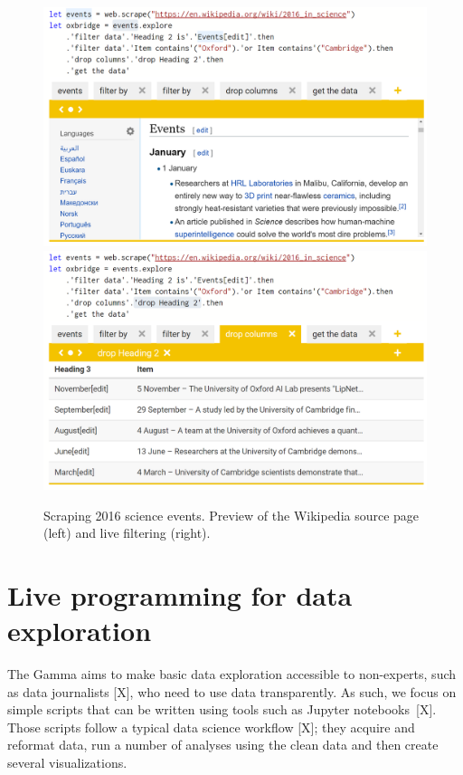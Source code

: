 \documentclass[sigplan,10pt]{acmart}\settopmatter{printfolios=true,printccs=false,printacmref=false}
\theoremstyle{plain}
\theoremstyle{definition}
\begin{document}
\begin{figure}
\includegraphics[scale=0.21]{wiki.png}
\includegraphics[scale=0.21]{drop.png}
\caption{Scraping 2016 science events. Preview of the Wikipedia source page (left) and live filtering (right).}
\label{fig:thegamma}
\end{figure}


\section{Live programming for data exploration}
\label{sec:live}


The Gamma aims to make basic data exploration accessible to non-experts, such as data journalists [X], who
need to use data transparently. As such, we focus on simple scripts that can be written using
tools such as Jupyter notebooks~[X]. Those scripts follow a typical data science workflow [X];
they acquire and reformat data, run a number of analyses using the clean data and then create 
several visualizations.
\end{document}

